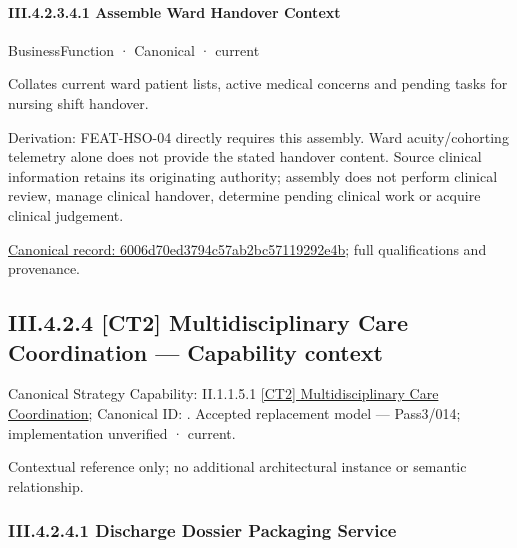 \paragraph*{III.4.2.3.4.1 Assemble Ward Handover Context}
\label{navigation:III.4.2.3.4.1}

\label{element:6006d70ed3794c57ab2bc57119292e4b}
{\small BusinessFunction · Canonical · current}\par

Collates current ward patient lists, active medical concerns and pending tasks for nursing shift handover.



Derivation: FEAT-HSO-04 directly requires this assembly. Ward acuity/cohorting telemetry alone does not provide the stated handover content. Source clinical information retains its originating authority; assembly does not perform clinical review, manage clinical handover, determine pending clinical work or acquire clinical judgement.


{\footnotesize \href{../../../../../../../../continuum/business/business-function/6006d70ed3794c57ab2bc57119292e4b.md}{Canonical record: 6006d70ed3794c57ab2bc57119292e4b}; full qualifications and provenance.}\par
\subsection*{III.4.2.4 [CT2] Multidisciplinary Care Coordination — Capability context}
\label{navigation:III.4.2.4}

{\small Canonical Strategy Capability: II.1.1.5.1 \hyperref[element:b7ff18e86b5d436eba7074899cb3df1c]{[CT2] Multidisciplinary Care Coordination}; Canonical ID: \texttt{}. Accepted replacement model — Pass3/014; implementation unverified · current.}\par
Contextual reference only; no additional architectural instance or semantic relationship.\par
\subsubsection*{III.4.2.4.1 Discharge Dossier Packaging Service}
\label{navigation:III.4.2.4.1}

